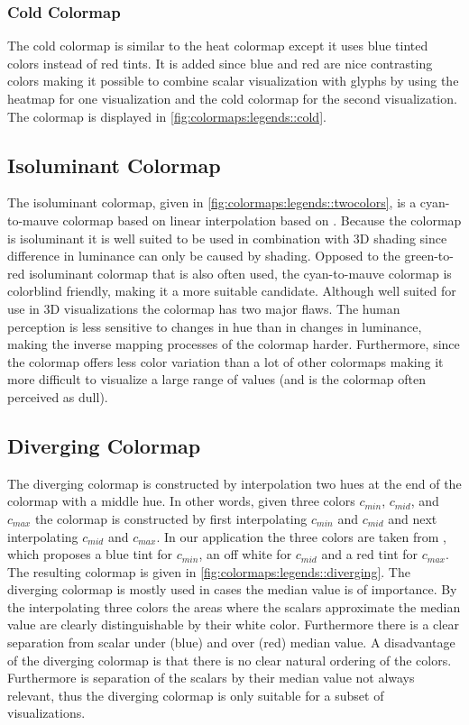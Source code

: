 \subsubsection{Cold Colormap} %
\label{ssub:cold_colormap}
The cold colormap is similar to the heat colormap except it uses blue tinted colors instead of red tints. It is added since blue and red are nice contrasting colors making it possible to combine scalar visualization with glyphs by using the heatmap for one visualization and the cold colormap for the second visualization. The colormap is displayed in \cref{fig:colormaps:legends::cold}.

\subsection{Isoluminant Colormap} %
\label{sub:two_hue_colormap}
The isoluminant colormap, given in \cref{fig:colormaps:legends::twocolors}, is a cyan-to-mauve colormap based on linear interpolation based on \cite{divergingMoreland2009}. Because the colormap is isoluminant it is well suited to be used in combination with 3D shading since difference in luminance can only be caused by shading. Opposed to the green-to-red isoluminant colormap that is also often used, the cyan-to-mauve colormap is colorblind friendly, making it a more suitable candidate. Although well suited for use in 3D visualizations the colormap has two major flaws. The human perception is less sensitive to changes in hue than in changes in luminance, making the inverse mapping processes of the colormap harder. Furthermore, since the colormap offers less color variation than a lot of other colormaps making it more difficult to visualize a large range of values (and is the colormap often perceived as dull).

\subsection{Diverging Colormap} %
\label{sub:diverging_colormap}
The diverging colormap is constructed by interpolation two hues at the end of the colormap with a middle hue. In other words, given three colors $c_{min}$, $c_{mid}$, and $c_{max}$ the colormap is constructed by first interpolating $c_{min}$ and $c_{mid}$ and next interpolating $c_{mid}$ and $c_{max}$. In our application the three colors are taken from \cite{divergingMoreland2009}, which proposes a blue tint for $c_{min}$, an off white for $c_{mid}$ and a red tint for $c_{max}$. The resulting colormap is given in \cref{fig:colormaps:legends::diverging}. The diverging colormap is mostly used in cases the median value is of importance. By the interpolating three colors the areas where the scalars approximate the median value are clearly distinguishable by their white color. Furthermore there is a clear separation from scalar under (blue) and over (red) median value. A disadvantage of the diverging colormap is that there is no clear natural ordering of the colors. Furthermore is separation of the scalars by their median value not always relevant, thus the diverging colormap is only suitable for a subset of visualizations.

